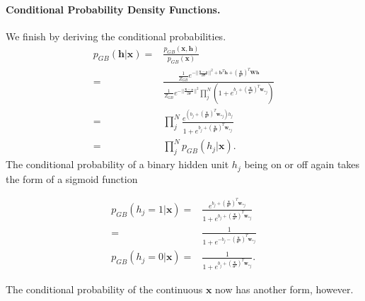 \documentclass[%
oneside,                 %
final,                   %
10pt]{article}
\begin{document}
\paragraph{Conditional Probability Density Functions.}
We finish by deriving the conditional probabilities.
\begin{align}
	p_{GB} (\bm{h}| \bm{x}) =& \frac{p_{GB} (\bm{x}, \bm{h})}{p_{GB} (\bm{x})} \nonumber \\
	=& \frac{\frac{1}{Z_{GB}} e^{-\vert\vert\frac{\bm{x} -\bm{a}}{2\bm{\sigma}}\vert\vert^2 + \bm{b}^T \bm{h} 
	+ (\frac{\bm{x}}{\bm{\sigma}^2})^T \bm{W}\bm{h}}}
	{\frac{1}{Z_{GB}} e^{-\vert\vert\frac{\bm{x} -\bm{a}}{2\bm{\sigma}}\vert\vert^2}
	\prod_j^N (1 + e^{b_j + (\frac{\bm{x}}{\bm{\sigma}^2})^T \bm{w}_{\ast j}} ) }
	\nonumber \\
	=& \prod_j^N \frac{e^{(b_j + (\frac{\bm{x}}{\bm{\sigma}^2})^T \bm{w}_{\ast j})h_j } }
	{1 + e^{b_j + (\frac{\bm{x}}{\bm{\sigma}^2})^T \bm{w}_{\ast j}}} \nonumber \\
	=& \prod_j^N p_{GB} (h_j|\bm{x}).
\end{align}
The conditional probability of a binary hidden unit $h_j$ being on or off again takes the form of a sigmoid function

\begin{align}
	p_{GB} (h_j =1 | \bm{x}) =& \frac{e^{b_j + (\frac{\bm{x}}{\bm{\sigma}^2})^T \bm{w}_{\ast j} } }
	{1 + e^{b_j + (\frac{\bm{x}}{\bm{\sigma}^2})^T \bm{w}_{\ast j}}} \nonumber \\
	=& \frac{1}{1 + e^{-b_j - (\frac{\bm{x}}{\bm{\sigma}^2})^T \bm{w}_{\ast j}}} \\
	p_{GB} (h_j =0 | \bm{x}) =&
	\frac{1}{1 + e^{b_j +(\frac{\bm{x}}{\bm{\sigma}^2})^T \bm{w}_{\ast j}}} .
\end{align}

The conditional probability of the continuous $\bm{x}$ now has another form, however.
\end{document}
